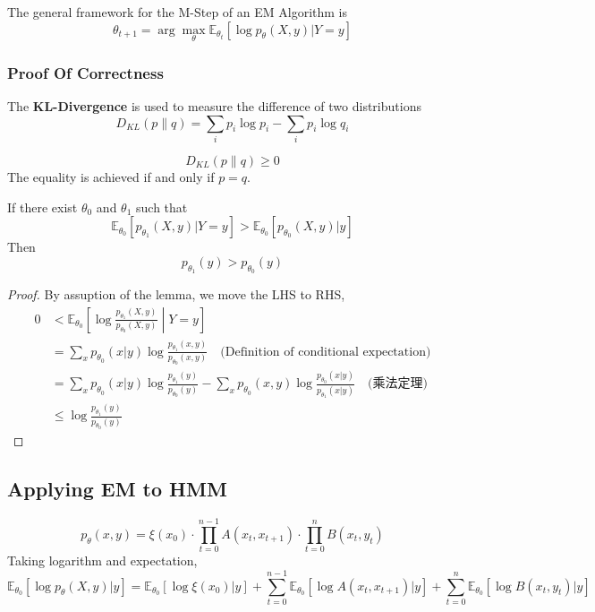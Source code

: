         The general framework for the M-Step of an EM Algorithm is
        \[ \theta_{t+1} = \arg\max_{\theta} \mathbb{E}_{\theta_t}\left[ \log p_{\theta}(X,y)|Y=y \right] \]

        \subsubsection{Proof Of Correctness}
        \begin{definition}[KL Divergence]\label{Def:KLDivergence}
            The \textbf{KL-Divergence} is used to measure the difference of two distributions
            \[ D_{KL}(p\|q) = \sum_i p_i\log p_i - \sum_i p_i \log q_i \]
        \end{definition}
        \begin{proposition}\label{Prop:PositivityOfKLDivergence}
            \[ D_{KL}(p\|q) \ge 0 \]
            The equality is achieved if and only if $p=q$.
        \end{proposition}

        \begin{lemma}\label{Lem:IncreasingLowerBoundOfEMAlgo}
            If there exist $\theta_0$ and $\theta_1$ such that
            \[ \mathbb{E}_{\theta_0}[p_{\theta_1}(X,y)|Y=y] > \mathbb{E}_{\theta_0}[p_{\theta_0}(X,y)|y] \]
            Then
            \[ p_{\theta_1}(y) > p_{\theta_0}(y) \]
        \end{lemma}
        \begin{proof}
            By assuption of the lemma, we move the LHS to RHS,
            \begin{align*}
                0 &< \mathbb{E}_{\theta_0}\left[ \log \frac{p_{\theta_1}(X,y)}{p_{\theta_0}(X,y)} \middle\vert Y=y \right]\\
                &= \sum_x p_{\theta_0}(x|y) \log \frac{p_{\theta_1}(x,y)}{p_{\theta_0}(x,y)} \quad \text{(Definition of conditional expectation)}\\
                &= \sum_x p_{\theta_0}(x|y) \log \frac{p_{\theta_1}(y)}{p_{\theta_0}(y)} - \sum_x p_{\theta_0}(x,y)\log\frac{p_{\theta_0}(x|y)}{p_{\theta_1}(x|y)} \quad \text{(乘法定理)} \\
                &\le \log\frac{p_{\theta_1}(y)}{p_{\theta_0}(y)}
            \end{align*}
        \end{proof}

    \subsection{Applying EM to HMM}
        \[ p_{\theta}(x,y) = \xi(x_0) \cdot \prod_{t=0}^{n-1}A(x_t,x_{t+1}) \cdot \prod_{t=0}^n B(x_t, y_t) \]
        Taking logarithm and expectation,
        \[ \mathbb{E}_{\theta_0}\left[ \log p_{\theta}(X,y)|y \right] = \mathbb{E}_{\theta_0}[\log\xi(x_0)|y] + \sum_{t=0}^{n-1}\mathbb{E}_{\theta_0}[\log A(x_t,x_{t+1})|y] + \sum_{t=0}^n\mathbb{E}_{\theta_0}[\log B(x_t,y_t)|y] \]

